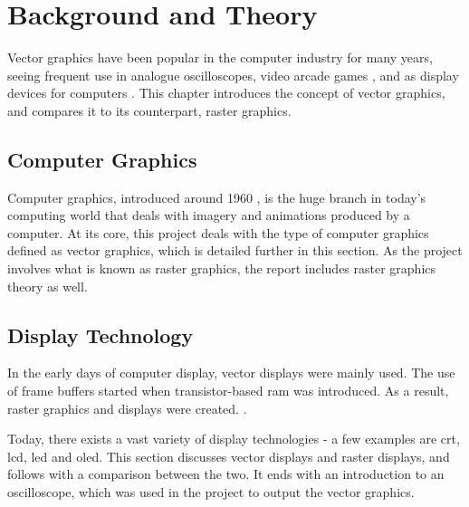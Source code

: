 \chapter{Background and Theory}
\label{chp:background}

Vector graphics have been popular in the computer industry for many years,
seeing frequent use in analogue oscilloscopes, video arcade games \cite{astroids},
and as display devices for computers \cite{ibm2250}\cite{tektronix4010}.
This chapter introduces the concept of vector graphics, and compares it to its counterpart, raster graphics.

\section{Computer Graphics}
Computer graphics, introduced around 1960 \cite[sec. 1.1.1]{graphics-visualization-algorithms}, is the huge branch in today's computing world that deals with imagery and animations produced by a computer.
At its core, this project deals with the type of computer graphics defined as vector graphics, which is detailed further in this section.
As the project involves what is known as raster graphics, the report includes raster graphics theory as well.





\section{Display Technology}
In the early days of computer display, vector displays were mainly used.
The use of frame buffers started when transistor-based \gls{ram} was introduced.
As a result, raster graphics and displays were created. \cite[sec. 1.1]{graphics-visualization-algorithms}.

Today, there exists a vast variety of display technologies - a few examples are \gls{crt}, \gls{lcd}, \gls{led} and \gls{oled}.
This section discusses vector displays and raster displays, and follows with a comparison between the two. It ends with an introduction to an oscilloscope, which was used in the project to output the vector graphics.






